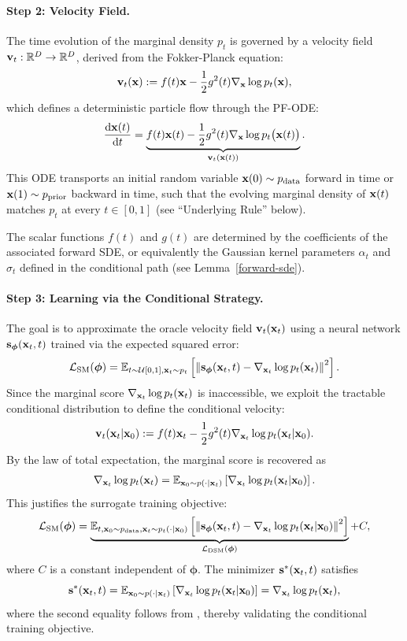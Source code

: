\paragraph{Step 2: Velocity Field.}
The time evolution of the marginal density $p_t$ is governed by a velocity field ${\mathbf{v}}_t : \mathbb{R}^D \to \mathbb{R}^D$, derived from the Fokker-Planck equation:
\begin{align}\label{eq:dm-velocity}
    {\mathbf{v}}_t({\mathbf{x}}) := f(t){\mathbf{x}} - \frac{1}{2}g^2(t)\nabla_{{\mathbf{x}}} \log p_t({\mathbf{x}}),
\end{align}
which defines a deterministic particle flow through the PF-ODE:
\[
\frac{\mathop{}\!\mathrm{d} {\mathbf{x}}(t)}{\mathop{}\!\mathrm{d} t} = \underbrace{f(t){\mathbf{x}}(t) - \frac{1}{2}g^2(t)\nabla_{{\mathbf{x}}} \log p_t\big({\mathbf{x}}(t)\big)}_{{\mathbf{v}}_t({\mathbf{x}}(t))}.
\]
This ODE transports an initial random variable ${\mathbf{x}}(0) \sim p_{\text{data}}$ forward in time or ${\mathbf{x}}(1) \sim p_{\text{prior}}$ backward in time, such that the evolving marginal density of ${\mathbf{x}}(t)$ matches $p_t$ at every $t \in [0,1]$  (see ``Underlying Rule'' below).

The scalar functions $f(t)$ and $g(t)$ are determined by the coefficients of the associated forward SDE, or equivalently the Gaussian kernel parameters $\alpha_t$ and $\sigma_t$ defined in the conditional path (see Lemma~\ref{forward-sde}).


\paragraph{Step 3: Learning via the Conditional Strategy.}
The goal is to approximate the oracle velocity field ${\mathbf{v}}_t({\mathbf{x}}_t)$ using a neural network ${\mathbf{s}}_{\bm{\phi}}({\mathbf{x}}_t, t)$ trained via the expected squared error:
\[
\mathcal{L}_{\text{SM}}({\bm{\phi}}) = \mathbb{E}_{t \sim \mathcal{U}[0,1],  {\mathbf{x}}_t \sim p_t} \left[ \left\| {\mathbf{s}}_{\bm{\phi}}({\mathbf{x}}_t, t) - \nabla_{{\mathbf{x}}_t} \log p_t({\mathbf{x}}_t) \right\|^2 \right].
\]
Since the marginal score $\nabla_{{\mathbf{x}}_t} \log p_t({\mathbf{x}}_t)$ is inaccessible, we exploit the tractable conditional distribution to define the conditional velocity:
\[
{\mathbf{v}}_t({\mathbf{x}}_t|{\mathbf{x}}_0) := f(t){\mathbf{x}}_t - \frac{1}{2}g^2(t) \nabla_{{\mathbf{x}}_t} \log p_t({\mathbf{x}}_t|{\mathbf{x}}_0).
\]
By the law of total expectation, the marginal score is recovered as
\begin{align}\label{eq:marginal-oracle-score}
    \nabla_{{\mathbf{x}}_t} \log p_t({\mathbf{x}}_t) = \mathbb{E}_{{\mathbf{x}}_0 \sim p(\cdot| {\mathbf{x}}_t)} \left[ \nabla_{{\mathbf{x}}_t} \log p_t({\mathbf{x}}_t|{\mathbf{x}}_0) \right].
\end{align}
This justifies the surrogate training objective:
\[
\mathcal{L}_{\text{SM}}({\bm{\phi}}) = \underbrace{\mathbb{E}_{t,  {\mathbf{x}}_0 \sim p_{\text{data}},  {\mathbf{x}}_t \sim p_t(\cdot|{\mathbf{x}}_0)} \left[ \left\| {\mathbf{s}}_{\bm{\phi}}({\mathbf{x}}_t, t) - \nabla_{{\mathbf{x}}_t} \log p_t({\mathbf{x}}_t|{\mathbf{x}}_0) \right\|^2 \right]}_{\mathcal{L}_{\text{DSM}}({\bm{\phi}})} + C,
\]
where $C$ is a constant independent of ${\bm{\phi}}$. The minimizer ${\mathbf{s}}^*({\mathbf{x}}_t, t)$ satisfies
\[
{\mathbf{s}}^*({\mathbf{x}}_t, t) = \mathbb{E}_{{\mathbf{x}}_0 \sim p(\cdot| {\mathbf{x}}_t)} \left[ \nabla_{{\mathbf{x}}_t} \log p_t({\mathbf{x}}_t|{\mathbf{x}}_0) \right] = \nabla_{{\mathbf{x}}_t} \log p_t({\mathbf{x}}_t),
\]
where the second equality follows from , thereby validating the conditional training objective.

